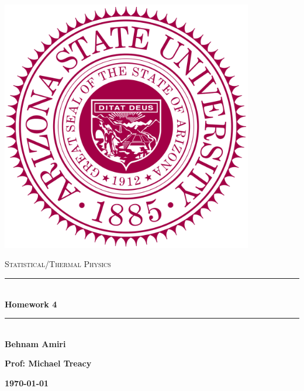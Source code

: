 \documentclass[fleqn]{article}
\begin{document}
  \begin{titlepage}

    \newcommand{\HRule}{\rule{\linewidth}{0.5mm}}

    \center

    \begin{center}
      \includegraphics[height=11cm, width=11cm]{asu.png}
    \end{center}

    \vline

    \textsc{\LARGE Statistical/Thermal Physics}\\[1.5cm]

    \HRule \\[0.5cm]
    { \huge \bfseries Homework 4}\\[0.4cm] 
    \HRule \\[1.0cm]

    \textbf{Behnam Amiri}

    \bigbreak

    \textbf{Prof: Michael Treacy}

    \bigbreak

    \textbf{{\large \today}\\[2cm]}

    \vfill

  \end{titlepage}
\end{document}
